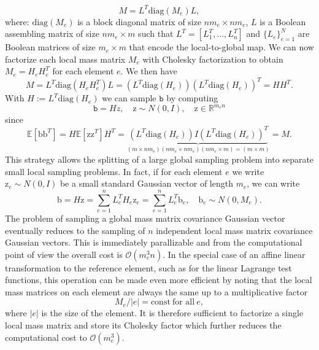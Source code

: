 \documentclass[a4paper, 11pt, oneside]{scrartcl}
\begin{document}
\begin{equation}
M = L^T \text{diag}(M_e)L,
\end{equation}
where: \(\text{diag}(M_e)\) is a block diagonal matrix of size \( nm_e \times nm_e\), \(L\) is a Boolean assembling matrix of size \( nm_e \times m \) such that \( L^T = [L_1^T, \dots , L_n^T]\) and \( \{ L_e \}_{e=1}^N \) are Boolean matrices of size \( m_e \times m\) that encode the local-to-global map. 
We can now factorize each local mass matrix \( M_e\) with Cholesky factorization to obtain \( M_e = H_e H_e^T\) for each element \(e\).
We then have 
\begin{equation}
M = L^T \text{diag}(H_e H_e^T)L = (L^T \text{diag}(H_e) )( L^T \text{diag}(H_e))^T = HH^T.
\end{equation}
With \( H:=L^T \text{diag}(H_e)\) we can sample \( \texttt{b} \) by computing
\begin{equation}
\texttt{b} = Hz, \quad \text{z} \sim N(0,I), \quad \text{z} \in \mathbb{R}^{m_en}
\end{equation}
since
\begin{equation}
\mathbb{E}[\text{b}\text{b}^T] = H \mathbb{E}[ \text{z}\text{z}^T]H^T =\underbrace{(L^T \text{diag}(H_e) )I( L^T \text{diag}(H_e))^T}_{(m \times nm_e) ( nm_e \times nm_e) (nm_e \times m)= (m \times m)} = M.
\end{equation}
This strategy allows the splitting of a large global sampling problem into separate small local sampling problems. In fact, if for each element \(e\) we write \( \text{z}_e \sim N(0,I) \) be a small standard Gaussian vector of length \(m_e\), we can write 
\begin{equation}
\text{b} = H \text{z} = \sum_{e=1}^n L_e^TH_e \text{z}_e = \sum_{e=1}^n L_e^T \text{b}_e , \quad \text{b}_e \sim N(0,M_e) .
\end{equation}
The problem of sampling a global mass matrix covariance Gaussian vector eventually reduces to the sampling of \(n\) independent local mass matrix covariance Gaussian vectors. This is immediately parallizable and from the computational point of view the overall cost is \( \mathcal{O}(m_e^3n)\). 
In the special case of an affine linear transformation to the reference element, such as for the linear Lagrange test functions, this operation can be made even more efficient by noting that the local mass matrices on each element are always the same up to a multiplicative factor \[ M_e / |e|=\text{const} \ \text{for all} \ e,\] where \( |e|\) is the size of the element. It is therefore sufficient to factorize a single local mass matrix and store its Cholesky factor which further reduces the computational cost to \( \mathcal{O}(m_e^3). \) \\
\end{document}
